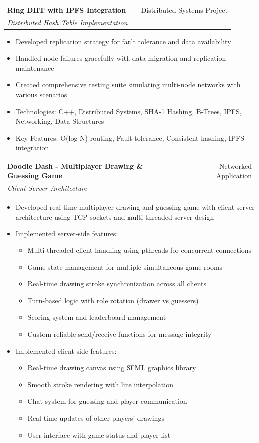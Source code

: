 \documentclass[a4paper,12pt]{article}
\makeatletter
\newenvironment{projectdetailed}[3]
    {
    \begin{tabularx}{\linewidth}{@{}l X r@{}}
    \textbf{#1} & \hfill & #2 \\
    \textit{#3} & & \\[3.75pt]
    \end{tabularx}
    \begin{minipage}[t]{\linewidth}
    \begin{itemize}[nosep,after=\strut, leftmargin=1em, itemsep=2pt,label=--]
    }
    {
    \end{itemize}
    \end{minipage}
    \vspace{6pt}
    }
\makeatother
\begin{document}
\begin{projectdetailed}{Ring DHT with IPFS Integration}{Distributed Systems Project}{Distributed Hash Table Implementation}
\item Developed replication strategy for fault tolerance and data availability
\item Handled node failures gracefully with data migration and replication maintenance
\item Created comprehensive testing suite simulating multi-node networks with various scenarios
\item Technologies: C++, Distributed Systems, SHA-1 Hashing, B-Trees, IPFS, Networking, Data Structures
\item Key Features: O(log N) routing, Fault tolerance, Consistent hashing, IPFS integration
\end{projectdetailed}

\begin{projectdetailed}{Doodle Dash - Multiplayer Drawing \& Guessing Game}{Networked Application}{Client-Server Architecture}
\item Developed real-time multiplayer drawing and guessing game with client-server architecture using TCP sockets and multi-threaded server design
\item Implemented server-side features:
\begin{itemize}[nosep, leftmargin=2em]
    \item Multi-threaded client handling using pthreads for concurrent connections
    \item Game state management for multiple simultaneous game rooms
    \item Real-time drawing stroke synchronization across all clients
    \item Turn-based logic with role rotation (drawer vs guessers)
    \item Scoring system and leaderboard management
    \item Custom reliable send/receive functions for message integrity
\end{itemize}
\item Implemented client-side features:
\begin{itemize}[nosep, leftmargin=2em]
    \item Real-time drawing canvas using SFML graphics library
    \item Smooth stroke rendering with line interpolation
    \item Chat system for guessing and player communication
    \item Real-time updates of other players' drawings
    \item User interface with game status and player list

\end{itemize}
\end{projectdetailed}
\end{document}
